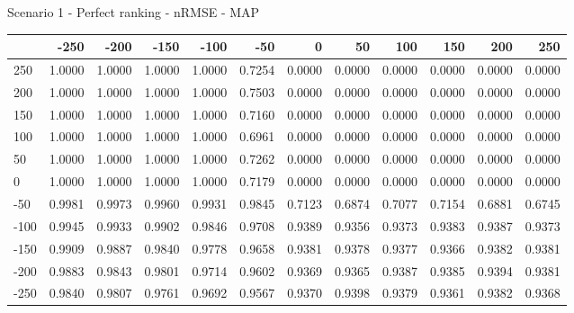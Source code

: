 Scenario 1 - Perfect ranking - nRMSE - MAP
\begin{tabular}{lrrrrrrrrrrr}
\toprule
{} &   -250 &   -200 &   -150 &   -100 &   -50  &    0   &    50  &    100 &    150 &    200 &    250 \\
\midrule
 250 & 1.0000 & 1.0000 & 1.0000 & 1.0000 & 0.7254 & 0.0000 & 0.0000 & 0.0000 & 0.0000 & 0.0000 & 0.0000 \\
 200 & 1.0000 & 1.0000 & 1.0000 & 1.0000 & 0.7503 & 0.0000 & 0.0000 & 0.0000 & 0.0000 & 0.0000 & 0.0000 \\
 150 & 1.0000 & 1.0000 & 1.0000 & 1.0000 & 0.7160 & 0.0000 & 0.0000 & 0.0000 & 0.0000 & 0.0000 & 0.0000 \\
 100 & 1.0000 & 1.0000 & 1.0000 & 1.0000 & 0.6961 & 0.0000 & 0.0000 & 0.0000 & 0.0000 & 0.0000 & 0.0000 \\
 50  & 1.0000 & 1.0000 & 1.0000 & 1.0000 & 0.7262 & 0.0000 & 0.0000 & 0.0000 & 0.0000 & 0.0000 & 0.0000 \\
 0   & 1.0000 & 1.0000 & 1.0000 & 1.0000 & 0.7179 & 0.0000 & 0.0000 & 0.0000 & 0.0000 & 0.0000 & 0.0000 \\
-50  & 0.9981 & 0.9973 & 0.9960 & 0.9931 & 0.9845 & 0.7123 & 0.6874 & 0.7077 & 0.7154 & 0.6881 & 0.6745 \\
-100 & 0.9945 & 0.9933 & 0.9902 & 0.9846 & 0.9708 & 0.9389 & 0.9356 & 0.9373 & 0.9383 & 0.9387 & 0.9373 \\
-150 & 0.9909 & 0.9887 & 0.9840 & 0.9778 & 0.9658 & 0.9381 & 0.9378 & 0.9377 & 0.9366 & 0.9382 & 0.9381 \\
-200 & 0.9883 & 0.9843 & 0.9801 & 0.9714 & 0.9602 & 0.9369 & 0.9365 & 0.9387 & 0.9385 & 0.9394 & 0.9381 \\
-250 & 0.9840 & 0.9807 & 0.9761 & 0.9692 & 0.9567 & 0.9370 & 0.9398 & 0.9379 & 0.9361 & 0.9382 & 0.9368 \\
\bottomrule
\end{tabular}

